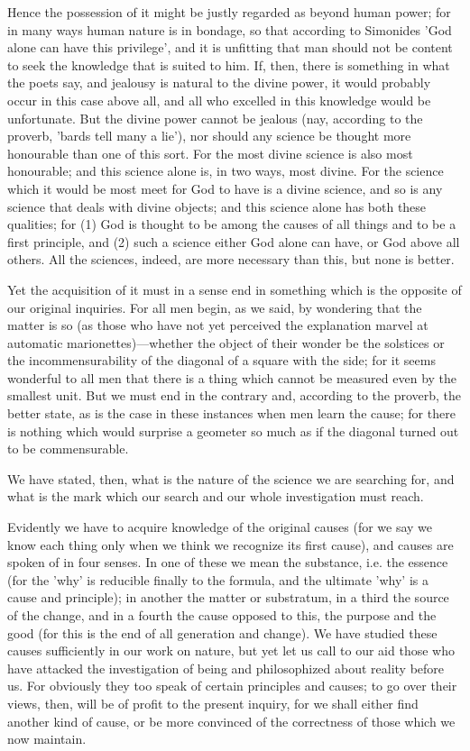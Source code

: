 Hence the possession of it might be justly regarded as beyond human power; for in many ways human nature is in bondage, so that according to Simonides 'God alone can have this privilege', and it is unfitting that man should not be content to seek the knowledge that is suited to him. If, then, there is something in what the poets say, and jealousy is natural to the divine power, it would probably occur in this case above all, and all who excelled in this knowledge would be unfortunate. But the divine power cannot be jealous (nay, according to the proverb, 'bards tell many a lie'), nor should any science be thought more honourable than one of this sort. For the most divine science is also most honourable; and this science alone is, in two ways, most divine. For the science which it would be most meet for God to have is a divine science, and so is any science that deals with divine objects; and this science alone has both these qualities; for (1) God is thought to be among the causes of all things and to be a first principle, and (2) such a science either God alone can have, or God above all others. All the sciences, indeed, are more necessary than this, but none is better.

Yet the acquisition of it must in a sense end in something which is the opposite of our original inquiries. For all men begin, as we said, by wondering that the matter is so (as those who have not yet perceived the explanation marvel at automatic marionettes)—whether the object of their wonder be the solstices or the incommensurability of the diagonal of a square with the side; for it seems wonderful to all men that there is a thing which cannot be measured even by the smallest unit. But we must end in the contrary and, according to the proverb, the better state, as is the case in these instances when men learn the cause; for there is nothing which would surprise a geometer so much as if the diagonal turned out to be commensurable.

We have stated, then, what is the nature of the science we are searching for, and what is the mark which our search and our whole investigation must reach.


Evidently we have to acquire knowledge of the original causes (for we say we know each thing only when we think we recognize its first cause), and causes are spoken of in four senses. In one of these we mean the substance, i.e. the essence (for the 'why' is reducible finally to the formula, and the ultimate 'why' is a cause and principle); in another the matter or substratum, in a third the source of the change, and in a fourth the cause opposed to this, the purpose and the good (for this is the end of all generation and change). We have studied these causes sufficiently in our work on nature, but yet let us call to our aid those who have attacked the investigation of being and philosophized about reality before us. For obviously they too speak of certain principles and causes; to go over their views, then, will be of profit to the present inquiry, for we shall either find another kind of cause, or be more convinced of the correctness of those which we now maintain.

